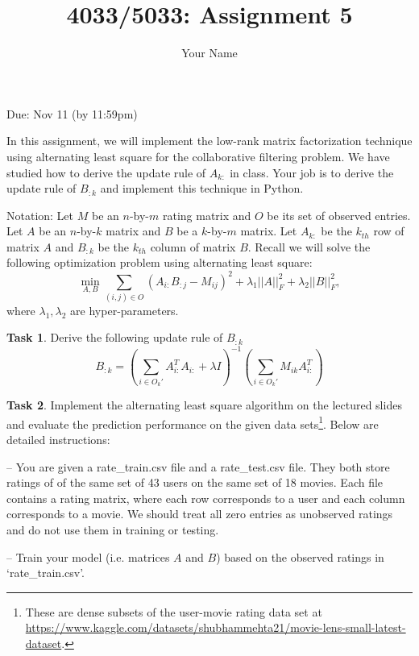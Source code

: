 \documentclass{llncs}
\title{4033/5033: Assignment 5}
\author{Your Name}
\institute{}
\begin{document}
\maketitle 

\setlength\parindent{0pt} 
\setlength{\parskip}{10pt}

Due: Nov 11 (by 11:59pm)

In this assignment, we will implement 
the low-rank matrix factorization technique 
using alternating least square for the 
collaborative filtering problem. 
We have studied how to derive the update 
rule of $A_{k:}$ in class. Your job is 
to derive the update rule of $B_{:k}$ 
and implement this technique in Python. 

Notation: Let $M$ be an $n$-by-$m$ rating 
matrix and $O$ be its set of observed entries. 
Let $A$ be an $n$-by-$k$ matrix and 
$B$ be a $k$-by-$m$ matrix. Let 
$A_{k:}$ be the $k_{th}$ row of matrix 
$A$ and $B_{:k}$ be the $k_{th}$ column 
of matrix $B$. 
Recall we will solve the 
following optimization problem using 
alternating least square:  
\begin{equation}
\min_{A, B} \sum_{(i,j) \in O} (A_{i:} B_{:j} - M_{ij})^2 
+ \lambda_1 ||A||_F^2 + \lambda_2 ||B||_F^2, 
\end{equation}
where $\lambda_1, \lambda_2$ are hyper-parameters. 

\textbf{Task 1}. Derive the following 
update rule of $B_{:k}$
\begin{equation}
B_{:k} = \left(\sum_{i \in O_k'} 
A_{i:}^T A_{i:} + \lambda I \right)^{-1} 
\left(\sum_{i \in O_k'} M_{ik} A_{i:}^T\right)
\end{equation}

\textbf{Task 2}. Implement the alternating 
least square algorithm on the lectured slides 
and evaluate the prediction performance on the given data sets\footnote{These are dense subsets of the user-movie rating data set at \url{https://www.kaggle.com/datasets/shubhammehta21/movie-lens-small-latest-dataset}.}. 
Below are detailed instructions:

-- You are given a rate\_train.csv file 
and a rate\_test.csv file. They both store 
ratings of of the same set of 43 users on 
the same set of 18 movies. 
Each file contains a rating matrix, 
where each row corresponds to a user and each 
column corresponds to a movie. We should 
treat all zero entries as unobserved 
ratings and do not use them in training or testing. 

-- Train your model (i.e. matrices $A$ and $B$) 
based on the observed ratings in `rate\_train.csv'. 
\end{document}
